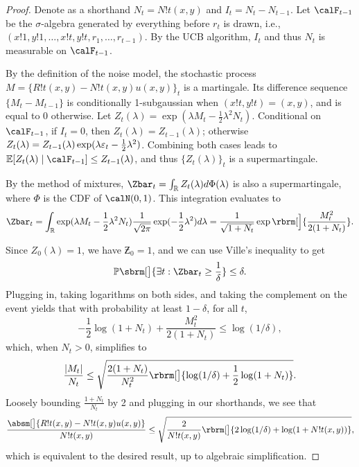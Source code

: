 \begin{proof}
    Denote as a shorthand $N_t=N!t(x,y)$ and $I_t=N_t-N_{t-1}$. Let $\calF_{t-1}$ be the $\sigma$-algebra generated by everything before $r_t$ is drawn, i.e., $(x!1,y!1,\dots,x!t,y!t,r_1,\dots,r_{t-1})$. By the UCB algorithm, $I_t$ and thus $N_t$ is measurable on $\calF_{t-1}$.
    
    By the definition of the noise model, the stochastic process $M=\{R!t(x,y)-N!t(x,y) u(x,y)\}_t$ is a martingale. Its difference sequence $\{M_t-M_{t-1}\}$ is conditionally 1-subgaussian when $(x!t,y!t)=(x,y)$, and is equal to 0 otherwise. Let $Z_t(\lambda)=\exp(\lambda M_t - \frac12 \lambda^2 N_t)$. Conditional on $\calF_{t-1}$, if $I_t=0$, then $Z_t(\lambda)=Z_{t-1}(\lambda)$; otherwise $Z_t(\lambda)=Z_{t-1}(\lambda)\exp(\lambda \varepsilon_t - \frac12 \lambda^2)$. Combining both cases leads to $\EE\sbr{Z_t(\lambda)\mid\calF_{t-1}}\leq Z_{t-1}(\lambda)$, and thus $\{Z_t(\lambda)\}_t$ is a supermartingale.

    By the method of mixtures, $\Zbar_t=\int_\dR Z_t(\lambda) d\Phi(\lambda)$ is also a supermartingale, where $\Phi$ is the CDF of $\calN(0, 1)$. This integration evaluates to
    \begin{equation*}
        \Zbar_t=\int_\dR \exp(\lambda M_t - \frac12 \lambda^2 N_t) \frac{1}{\sqrt{2\pi}}\exp(-\frac 12 \lambda^2) d\lambda = \frac{1}{\sqrt{1+N_t}} \exp\rbrm[\Big]{\frac{M_t^2}{2(1+N_t)}}.
    \end{equation*}

    Since $Z_0(\lambda)=1$, we have $\Zbar_0=1$, and we can use Ville's inequality to get
    \begin{equation*}
        \PP\sbrm[\big]{\exists t: \Zbar_t\geq \frac{1}{\delta}}\leq \delta.
    \end{equation*}
    Plugging in, taking logarithms on both sides, and taking the complement on the event yields that with probability at least $1-\delta$, for all $t$,
    \begin{equation*}
        -\frac12 \log(1+N_t) + \frac{M_t^2}{2(1+N_t)} \leq \log(1/\delta),
    \end{equation*}
    which, when $N_t>0$, simplifies to
    \begin{equation*}
        \frac{|M_t|}{N_t}\leq \sqrt{\frac{2(1+N_t)}{N_t^2}\rbrm[\big]{\log(1/\delta)+\frac12 \log(1+N_t)}}.
    \end{equation*}
    Loosely bounding $\frac{1+N_t}{N_t}$ by 2 and plugging in our shorthands, we see that
    \begin{equation*}
        \frac{\absm[\big]{R!t(x,y)-N!t(x,y) u(x,y)}}{N!t(x,y)} \leq \sqrt{\frac{2}{N!t(x,y)}\rbrm[\big]{2\log(1/\delta)+\log(1+N!t(x,y))}},
    \end{equation*}
    which is equivalent to the desired result, up to algebraic simplification.
\end{proof}

